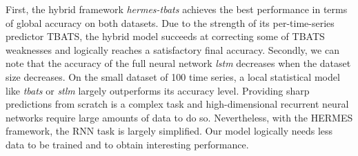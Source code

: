 \documentclass[lettersize,journal]{IEEEtran}
\begin{document}
First, the hybrid framework \textit{hermes-tbats} achieves the best performance in terms of global accuracy on both datasets. Due to the strength of its per-time-series predictor TBATS, the hybrid model succeeds at correcting some of TBATS weaknesses and logically reaches a satisfactory final accuracy. Secondly, we can note that the accuracy of the full neural network \textit{lstm} decreases when the dataset size decreases. On the small dataset of 100 time series, a local statistical model like \textit{tbats} or \textit{stlm} largely outperforms its accuracy level. Providing sharp predictions from scratch is a complex task and high-dimensional recurrent neural networks require  large amounts of data to do so. Nevertheless, with the HERMES framework, the RNN task is largely simplified. Our model logically needs less data to be trained and to obtain interesting performance.
\end{document}
